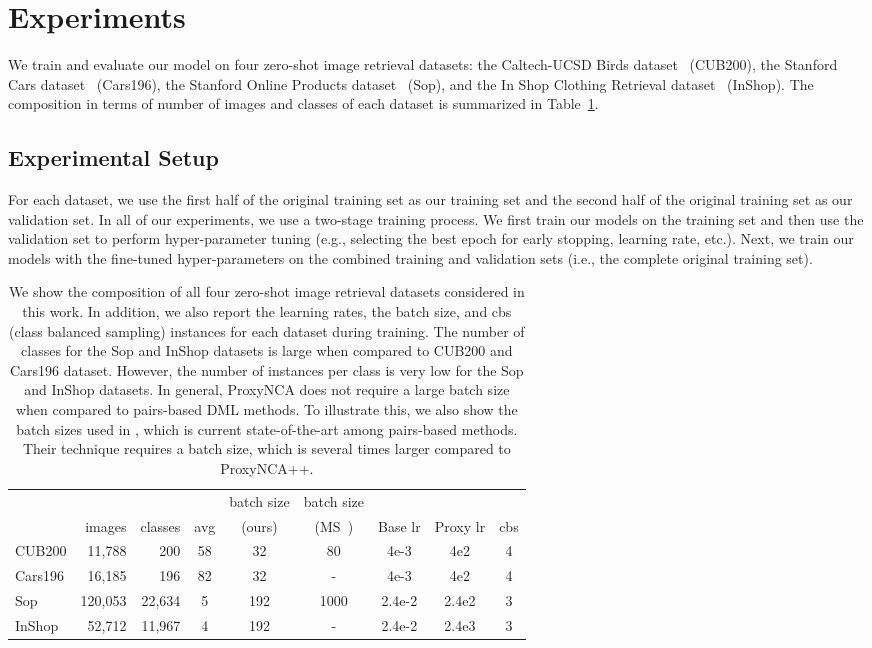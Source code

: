 \documentclass[runningheads]{llncs}
\begin{document}
\section{Experiments}\label{sec:experiment}

We train and evaluate our model on four zero-shot image retrieval datasets: the Caltech-UCSD Birds dataset~\cite{wah2011caltech} (CUB200), the Stanford Cars dataset~\cite{KrauseStarkDengFei-Fei_3DRR2013} (Cars196), the Stanford Online Products dataset~\cite{song2016deep} (Sop), and the In Shop Clothing Retrieval dataset~\cite{liu2016deepfashion} (InShop). The composition in terms of number of images and classes of each dataset is summarized in Table~\ref{table:dataset}.

\subsection{Experimental Setup}

For each dataset, we use the first half of the original training set as our training set and the second half of the original training set as our validation set. In all of our experiments, we use a two-stage training process. We first train our models on the training set and then use the validation set to perform hyper-parameter tuning (e.g., selecting the best epoch for early stopping, learning rate, etc.). Next, we train our models with the fine-tuned hyper-parameters on the combined training and validation sets (i.e., the complete original training set).


\begin{table}
\centering
\caption{We show the composition of all four zero-shot image retrieval datasets considered in this work. In addition, we also report the learning rates, the batch size, and cbs (class balanced sampling) instances for each dataset during training. The number of classes for the Sop and InShop datasets is large when compared to CUB200 and Cars196 dataset. However, the number of instances per class is very low for the Sop and InShop datasets. In general, ProxyNCA does not require a large batch size when compared to pairs-based DML methods. To illustrate this, we also show the batch sizes used in \cite{wang2019multi}, which is current state-of-the-art among pairs-based methods. Their technique requires a batch size, which is several times larger compared to ProxyNCA++.}
\setlength{\tabcolsep}{3pt}
\begin{tabular}{|lrrccc|ccc|}
\hline
 &  &  &  & batch size & batch size & & & \\
 & images & classes & avg & (ours) & (MS~\cite{wang2019multi}) & Base lr & Proxy lr & cbs\\ \hline
\small{CUB200}& 11,788 & 200 & 58 & 32 & 80      & 4e-3 & 4e2 &4 \\
\small{Cars196}& 16,185 & 196 & 82 & 32 & -      & 4e-3 & 4e2 &4\\
\small{Sop}& 120,053 & 22,634 & 5 & 192 & 1000   & 2.4e-2 & 2.4e2 &3\\
\small{InShop}& 52,712 & 11,967 & 4 & 192 & -    & 2.4e-2 & 2.4e3 &3\\
\hline
\end{tabular}
\label{table:dataset}
\end{table}
\end{document}
